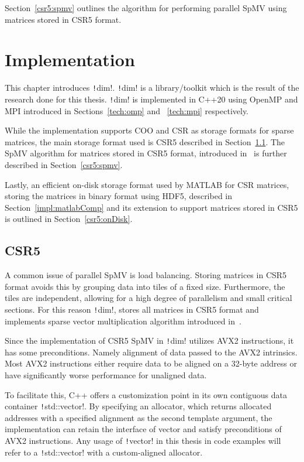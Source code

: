 \documentclass[thesis=M,english]{FITthesis}[2019/12/23]
\newcommand{\csre}[1]{\texttt!#1!}
\begin{document}
Section~\ref{csr5:spmv} outlines the algorithm for performing parallel SpMV using matrices stored in CSR5 format.


\chapter{Implementation}\label{impl}

This chapter introduces \csre{dim}. \csre{dim} is a library/toolkit which is the result of the research done for this
thesis. \csre{dim} is implemented in C++20 using OpenMP and MPI introduced in Sections~\ref{tech:omp} and
~\ref{tech:mpi} respectively.

While the implementation supports COO and CSR as storage formats for sparse matrices, the main storage
format used is CSR5 described in Section~\ref{impl:csr5}. The SpMV algorithm for matrices stored in CSR5
format, introduced in~\cite{liu2015csr5} is further described in Section~\ref{csr5:spmv}.

Lastly, an efficient on-disk storage format used by MATLAB for CSR matrices, storing the matrices in
binary format using HDF5, described in Section~\ref{impl:matlabComp} and its extension to support
matrices stored in CSR5 is outlined in Section~\ref{csr5:onDisk}.

\section{CSR5}\label{impl:csr5}

A common issue of parallel SpMV is load balancing. Storing matrices in CSR5 format avoids this by
grouping data into tiles of a fixed size. Furthermore, the tiles are independent, allowing for a high
degree of parallelism and small critical sections. For this reason \csre{dim}, stores all matrices in
CSR5 format and implements sparse vector multiplication algorithm introduced in~\cite{liu2015csr5}.

Since the implementation of CSR5 SpMV in \csre{dim} utilizes AVX2 instructions, it has some preconditions.
Namely alignment of data passed to the AVX2 intrinsics. Most AVX2 instructions either require data to be
aligned on a 32-byte address or have significantly worse performance for unaligned data.

To facilitate this, C++ offers a customization point in its own contiguous data container \csre{std::vector}.
By specifying an allocator, which returns allocated addresses with a specified alignment as the second
template argument, the implementation can retain the interface of vector and satisfy preconditions of
AVX2 instructions. Any usage of \csre{vector} in this thesis in code examples will refer to a \csre{std::vector}
with a custom-aligned allocator.
\end{document}

